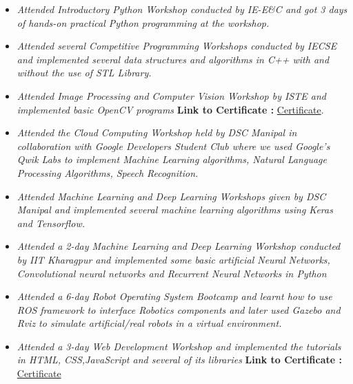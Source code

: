 \documentclass[a4paper,12pt]{article}
\begin{document}
\begin{itemize}
    \item{\textit{Attended Introductory Python Workshop conducted by IE-E\&C
              and got 3 days of hands-on practical Python programming at
              the workshop.}}
    \item{\textit{Attended several Competitive Programming Workshops
              conducted by IECSE and implemented several data structures
              and algorithms in C++ with and without the use of STL Library.}}
    \item{\textit{Attended Image Processing and Computer Vision Workshop by ISTE and implemented basic OpenCV programs }}
          \textbf{Link to Certificate :} \href{https://github.com/teetangh/Kaustav-All-Certifications/blob/master/Computer%20Vision%20and%20NLP/ISTE%20Image%20Processing%20using%20OpenCV/180905188.jpg}{Certificate}.
    \item{\textit{Attended the Cloud Computing Workshop held by DSC
              Manipal in collaboration with Google Developers Student Club
              where we used Google’s Qwik Labs to implement Machine
              Learning algorithms, Natural Language Processing Algorithms,
              Speech Recognition.}}
    \item{\textit{Attended Machine Learning and Deep Learning Workshops
              given by DSC Manipal and implemented several machine
              learning algorithms using Keras and Tensorflow. }}
    \item{\textit{Attended a 2-day Machine Learning and Deep Learning Workshop
              conducted by IIT Kharagpur and implemented some basic artificial Neural Networks,
              Convolutional neural networks and Recurrent Neural Networks in Python }}
    \item{\textit{Attended a 6-day Robot Operating System Bootcamp and
              learnt how to use ROS framework to interface Robotics
              components and later used Gazebo and Rviz to simulate
              artificial/real robots in a virtual environment.}}
    \item{\textit{Attended a 3-day Web Development Workshop and implemented
              the tutorials in HTML, CSS,JavaScript and several of its libraries}}
          \textbf{Link to Certificate :} \href{https://github.com/teetangh/Kaustav-All-Certifications/blob/master/Web%20Development/IECSE%20-%20Web.IO%20Certificate.pdf}{Certificate}
\end{itemize}
\end{document}
